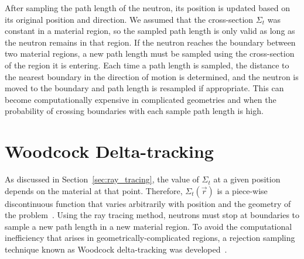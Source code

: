After sampling the path length of the neutron, its position is
updated based on its original position and direction. We assumed that
the cross-section $\Sigma_t$ was constant in a material region, so the
sampled path length is only valid as long as the neutron remains in
that region.  If the neutron reaches the boundary between two material
regions, a new path length must be sampled using the cross-section of
the region it is entering. Each time a path length is sampled, the
distance to the nearest boundary in the direction of motion is
determined, and the neutron is moved to the boundary and path length
is resampled if appropriate. This can become computationally expensive
in complicated geometries and when the probability of crossing
boundaries with each sample path length is high.

\section{Woodcock Delta-tracking}
\label{sec:delta-tracking}

As discussed in Section~\ref{sec:ray_tracing}, the value of $\Sigma_t$
at a given position depends on the material at that point. Therefore,
$\Sigma_t(\vec{r})$ is a piece-wise discontinuous function that varies
arbitrarily with position and the geometry of the
problem~\cite{leppanen2013}. Using the ray tracing method, neutrons
must stop at boundaries to sample a new path length in a new material
region. To avoid the computational inefficiency that arises in
geometrically-complicated regions, a rejection sampling technique
known as Woodcock delta-tracking was developed~\cite{woodcock1965}.


